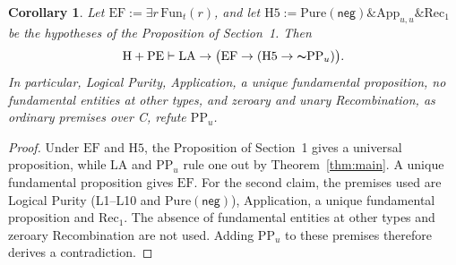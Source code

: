\documentclass[12pt,leqno]{article}
\newcommand{\AND}{\ensuremath{\mathbin{\&}}}
\newcommand{\IC}{\ensuremath{\rightarrow}}
\newcommand{\NOT}{\ensuremath{\text{$\thicksim$}}}
\newcommand{\dentails}{\ensuremath{\vdash}}
\newcommand{\Pure}{\ensuremath{\mathrm{Pure}}}
\newcommand{\Fun}{\ensuremath{\mathrm{Fun}}}
\newcommand{\PPu}{\ensuremath{\mathrm{PP}_u}}
\newcommand{\HPE}{\ensuremath{\mathrm{H}+\mathrm{PE}}}
\newcommand{\App}{\ensuremath{\mathrm{App}}}
\newcommand{\Rec}{\ensuremath{\mathrm{Rec}_1}}
\newcommand{\negop}{\ensuremath{\mathsf{neg}}}
\theoremstyle{plain}
\newtheorem*{corollary}{Corollary}
\begin{document}
\begin{corollary}
Let \(\mathrm{EF}:=\exists r\,\Fun_t(r)\), and let
\(\mathrm{H5}:=\Pure(\negop)\AND\App_{u,u}\AND\Rec\) be the hypotheses of
the Proposition of Section~1. Then
\[
 \HPE\dentails\mathrm{LA}\IC\bigl(\mathrm{EF}\IC(\mathrm{H5}\IC\NOT\PPu)\bigr).
\]
In particular, Logical Purity, Application, a unique fundamental
proposition, no fundamental entities at other types, and zeroary and
unary Recombination, as ordinary premises over C, refute \(\PPu\).
\end{corollary}
\begin{proof}
Under \(\mathrm{EF}\) and \(\mathrm{H5}\), the Proposition of
Section~1 gives a universal proposition, while \(\mathrm{LA}\) and
\(\PPu\) rule one out by Theorem~\ref{thm:main}. A unique fundamental
proposition gives \(\mathrm{EF}\). For the second claim, the premises
used are Logical Purity (L1--L10 and \(\Pure(\negop)\)), Application, a
unique fundamental proposition and \(\Rec\). The absence of fundamental
entities at other types and zeroary Recombination are not used. Adding \(\PPu\) to
these premises therefore derives a contradiction.
\end{proof}
\end{document}
